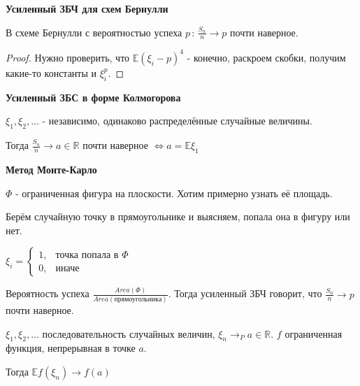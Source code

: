 \begin{consequence}
    \textbf{Усиленный ЗБЧ для схем Бернулли}

    В схеме Бернулли с вероятностью успеха $p \, : \, \frac{S_n}{n} \rightarrow p$ почти наверное.
\end{consequence}

\begin{proof}
    Нужно проверить, что $\mathbb{E}(\xi_i - p)^4$ - конечно, раскроем скобки, получим какие-то константы и $\xi_i^p$.
\end{proof}

\begin{theorem}
    \textbf{Усиленный ЗБС в форме Колмогорова}

    $\xi_1, \xi_2, \ldots$ - независимо, одинаково распределённые случайные величины.

    Тогда $\frac{S_n}{n} \rightarrow a \in \mathbb{R}$ почти наверное $\Leftrightarrow a = \mathbb{E}\xi_1$
\end{theorem}


\textbf{Метод Монте-Карло}

$\Phi$ - ограниченная фигура на плоскости. Хотим примерно узнать её площадь.

Берём случайную точку в прямоугольнике и выясняем, попала она в фигуру или нет.

$
\xi_i =
\begin{cases}
    1, & \text{точка попала в $\Phi$} \\
    0, & \text{иначе}
\end{cases}
$

Вероятность успеха $\frac{Area(\Phi)}{Area(\text{прямоугольника})}$. Тогда усиленный ЗБЧ
говорит, что $\frac{S_n}{n} \rightarrow p$ почти наверное.

\begin{theorem}
    $\xi_1, \xi_2, \ldots$ последовательность случайных величин, $\xi_n \rightarrow_P a \in \mathbb{R}$.
    $f$ ограниченная функция, непрерывная в точке $a$.

    Тогда $\mathbb{E}f(\xi_n) \rightarrow f(a)$
\end{theorem}

